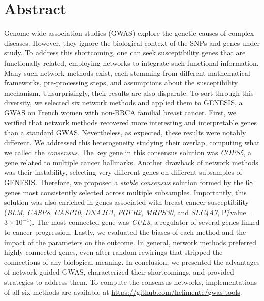\documentclass[10pt,letterpaper]{article}
\begin{document}
\section*{Abstract}
Genome-wide association studies (GWAS) explore the genetic causes of complex diseases. However, they ignore the biological context of the SNPs and genes under study. To address this shortcoming, one can seek susceptibility genes that are functionally related, employing networks to integrate such functional information. Many such network methods exist, each stemming from different mathematical frameworks, pre-processing steps, and assumptions about the susceptibility mechanism. Unsurprisingly, their results are also disparate. To sort through this diversity, we selected six network methods and applied them to GENESIS, a GWAS on French women with non-BRCA familial breast cancer. First, we verified that network methods recovered more interesting and interpretable genes than a standard GWAS. Nevertheless, as expected, these results were notably different. We addressed this heterogeneity studying their overlap, computing what we called the \emph{consensus}. The key gene in this consensus solution was \emph{COPS5}, a gene related to multiple cancer hallmarks. Another drawback of network methods was their instability, selecting very different genes on different subsamples of GENESIS. Therefore, we proposed a \emph{stable consensus} solution formed by the 68 genes most consistently selected across multiple subsamples. Importantly, this solution was also enriched in genes associated with breast cancer susceptibility (\emph{BLM}, \emph{CASP8}, \emph{CASP10}, \emph{DNAJC1}, \emph{FGFR2}, \emph{MRPS30}, and \emph{SLC4A7}, P\=/value~=~$3 \times 10^{-4}$). The most connected gene was \emph{CUL3}, a regulator of several genes linked to cancer progression. Lastly, we evaluated the biases of each method and the impact of the parameters on the outcome. In general, network methods preferred highly connected genes, even after random rewirings that stripped the connections of any biological meaning. In conclusion, we presented the advantages of network-guided GWAS, characterized their shortcomings, and provided strategies to address them. To compute the consensus networks, implementations of all six methods are available at \url{https://github.com/hclimente/gwas-tools}.

\end{document}
